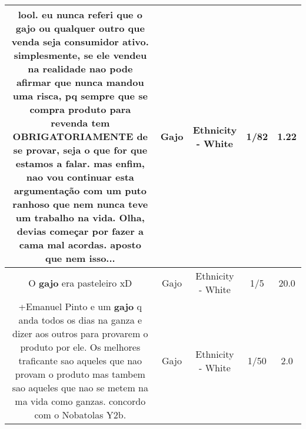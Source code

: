 \documentclass[11pt]{article}
\newlength\mylength
\begin{document}
\begin{center}
\begin{longtable}{|C{.65\mylength}|C{.30\mylength}|C{.12\mylength}|C{.12\mylength}|C{.12\mylength}|}
  \small lool. eu nunca referi que o \textbf{gajo} ou qualquer outro que venda seja consumidor ativo. simplesmente, se ele vendeu na realidade nao pode afirmar que nunca mandou uma risca, pq sempre que se compra produto para revenda tem OBRIGATORIAMENTE de se provar, seja o que for que estamos a falar. mas enfim, nao vou continuar esta argumentação com um puto ranhoso que nem nunca teve um trabalho na vida. Olha, devias começar por fazer a cama mal acordas. aposto que nem isso...\normalsize   & Gajo & Ethnicity - White & 1/82 & 1.22 \\  \hline
  \small O \textbf{gajo} era pasteleiro xD\normalsize   & Gajo & Ethnicity - White & 1/5 & 20.0 \\  \hline
  \small +Emanuel Pinto e um \textbf{gajo} q anda todos os dias na ganza e dizer aos outros para provarem o produto por ele. Os melhores traficante sao aqueles que nao provam o produto mas tambem sao aqueles que nao se metem na ma vida como ganzas. concordo com o Nobatolas Y2b.\normalsize   & Gajo & Ethnicity - White & 1/50 & 2.0 \\  \hline
  
\end{longtable}
\end{center}
\end{document}
